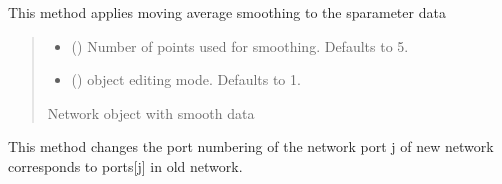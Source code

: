 \documentclass[letterpaper,10pt,english]{sphinxmanual}
\begin{document}
\begin{fulllineitems}
\begin{fulllineitems}
\label{\detokenize{touchstone:touchstone.spfile.smoothing}}
\pysigstartsignatures
{}
\pysigstopsignatures
\sphinxAtStartPar
This method applies moving average smoothing to the s\sphinxhyphen{}parameter data
\begin{quote}\begin{description}
\begin{itemize}
\item {} 
\sphinxAtStartPar
{} (\sphinxstyleliteralemphasis{\sphinxupquote{, }}) \textendash{} Number of points used for smoothing. Defaults to 5.

\item {} 
\sphinxAtStartPar
{} (\sphinxstyleliteralemphasis{\sphinxupquote{, }}) \textendash{} object editing mode. Defaults to \sphinxhyphen{}1.

\end{itemize}

\sphinxAtStartPar
Network object with smooth data

\sphinxAtStartPar
{\hyperref[\detokenize{touchstone:touchstone.spfile}]{}}

\end{description}\end{quote}

\end{fulllineitems}


\begin{fulllineitems}
\label{\detokenize{touchstone:touchstone.spfile.snp2smp}}
\pysigstartsignatures
{}
\pysigstopsignatures
\sphinxAtStartPar
This method changes the port numbering of the network
port j of new network corresponds to ports{[}j{]} in old network.


\end{fulllineitems}
\end{fulllineitems}
\end{document}
